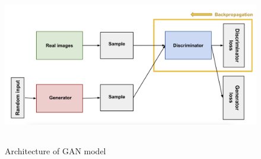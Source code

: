 	\begin{figure}[h!]
    \centering
    \includegraphics[width=\linewidth,height=7cm]{figures/1.png}
    \caption{ Architecture of GAN model}
    \label{fig:GAN model}
\end{figure}



\par  